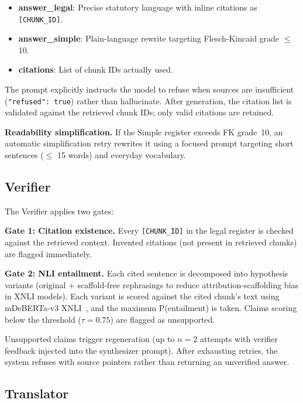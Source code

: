 \documentclass[conference]{IEEEtran}
\begin{document}
\begin{itemize}
    \item \textbf{answer\_legal}: Precise statutory language with inline citations as \texttt{[CHUNK\_ID]}.
    \item \textbf{answer\_simple}: Plain-language rewrite targeting Flesch-Kincaid grade $\leq$ 10.
    \item \textbf{citations}: List of chunk IDs actually used.
\end{itemize}

The prompt explicitly instructs the model to refuse when sources are insufficient (\texttt{"refused": true}) rather than hallucinate. After generation, the citation list is validated against the retrieved chunk IDs; only valid citations are retained.

\textbf{Readability simplification.} If the Simple register exceeds FK grade~10, an automatic simplification retry rewrites it using a focused prompt targeting short sentences ($\leq$ 15 words) and everyday vocabulary.

\subsection{Verifier}
\label{ssec:verifier}

The Verifier applies two gates:

\textbf{Gate 1: Citation existence.} Every \texttt{[CHUNK\_ID]} in the legal register is checked against the retrieved context. Invented citations (not present in retrieved chunks) are flagged immediately.

\textbf{Gate 2: NLI entailment.} Each cited sentence is decomposed into hypothesis variants (original + scaffold-free rephrasings to reduce attribution-scaffolding bias in XNLI models). Each variant is scored against the cited chunk's text using mDeBERTa-v3 XNLI~\cite{mdeberta}, and the maximum P(entailment) is taken. Claims scoring below the threshold ($\tau = 0.75$) are flagged as unsupported.

Unsupported claims trigger regeneration (up to $n=2$ attempts with verifier feedback injected into the synthesizer prompt). After exhausting retries, the system refuses with source pointers rather than returning an unverified answer.

\subsection{Translator}
\label{ssec:translator}
\end{document}
